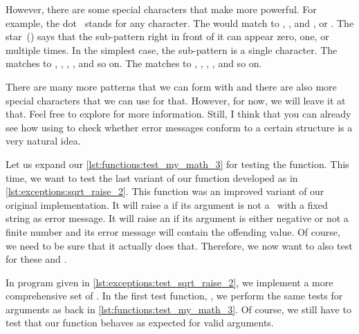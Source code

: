 However, there are some special characters that make  more powerful.
For example, the dot~ stands for any character.
The   would match to , , and , or .
The star~(\textil{*}) says that the sub-pattern right in front of it can appear zero, one, or multiple times.
In the simplest case, the sub-pattern is a single character.
The   matches to , , , , and so on.
The   matches to , , , , and so on.

There are many more patterns that we can form with  and there are also more special characters that we can use for that.
However, for now, we will leave it at that.
Feel free to explore for more information.
Still, I think that you can already see how using  to check whether error messages conform to a certain structure is a very natural idea.

Let us expand our \cref{lst:functions:test_my_math_3} for testing the  function.
This time, we want to test the last variant of our  function developed as   in \cref{lst:exceptions:sqrt_raise_2}.
This function was an improved variant of our original  implementation.
It will raise a  if its argument is not a~ with a fixed string as error message.
It will raise an  if its argument is either negative or not a finite number and its error message will contain the offending value.
Of course, we need to be sure that it actually does that.
Therefore, we now want to also test for these  and .

In program  given in \cref{lst:exceptions:test_sqrt_raise_2}, we implement a more comprehensive set of .
In the first test function, , we perform the same tests for  arguments as back in \cref{lst:functions:test_my_math_3}.
Of course, we still have to test that our function behaves as expected for valid arguments.


